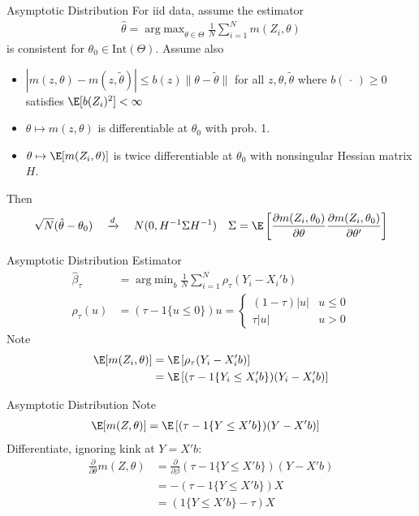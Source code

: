 \documentclass[aspectratio=169, handout]{beamer}
\DeclareMathOperator*{\argmin}{arg\;min}
\DeclareMathOperator*{\argmax}{arg\;max}
\newcommand{\dto}{\xrightarrow{d}}
\newcommand{\sumiN}{\sum^N_{i=1}}
\begin{document}
\begin{frame}{Asymptotic Distribution}
For iid data, assume the estimator
\begin{align*}
  \hat{\theta}
  =
  \argmax_{\theta\in\Theta}
  \frac{1}{N}
  \sumiN
  m(Z_i,\theta)
\end{align*}
is consistent for $\theta_0\in \text{Int}(\Theta)$.
Assume also
\begin{itemize}
  \item
    $|m(z,\theta)-m(z,\tilde{\theta})|\leq b(z)\lVert
    \theta-\tilde{\theta}\rVert$
    for all $z,\theta,\tilde{\theta}$ where
    $b(\,\cdot\,)\geq 0$
    satisfies $\E[b(Z_i)^2]<\infty$
  \item $\theta\mapsto m(z,\theta)$ is differentiable at $\theta_0$ with
    prob. 1.
  \item $\theta\mapsto \E[m(Z_i,\theta)]$ is twice differentiable at
    $\theta_0$ with nonsingular Hessian matrix $H$.
\end{itemize}
Then
\begin{align*}
  \sqrt{N}(\hat{\theta}-\theta_0)
  \quad\dto\quad
  N(0,H^{-1}\Sigma H^{-1})
  \quad
  \Sigma
  =
  \E
  \left[
    \frac{\partial m(Z_i,\theta_0)}{\partial \theta}
    \frac{\partial m(Z_i,\theta_0)}{\partial \theta'}
  \right]
\end{align*}
\end{frame}



\begin{frame}{Asymptotic Distribution}
Estimator
\begin{align*}
  \hat{\beta}_\tau
  &=
  \argmin_b
  \frac{1}{N}
  \sumiN
  \rho_\tau(Y_i-X_i'b)
  \\
  \rho_\tau(u)
  &=
  (\tau-{1}\{u\leq 0\})u
  =
  \begin{cases}
    (1-\tau)|u| & u \leq 0 \\
    \tau|u| & u > 0
  \end{cases}
\end{align*}
Note
\begin{align*}
  \E[m(Z_i,\theta)]
  &=
  \E\left[
    \rho_\tau(Y_i-X_i'b)
  \right]
  \\
  &=
  \E\left[
    (\tau-{1}\{Y_i\leq X_i'b\})(Y_i-X_i'b)
  \right]
\end{align*}
\end{frame}


{\footnotesize
\begin{frame}{Asymptotic Distribution}
Note
\begin{align*}
  \E[m(Z,\theta)]
  &=
  \E\left[
    (\tau-{1}\{Y\leq X'b\})(Y-X'b)
  \right]
\end{align*}
Differentiate, ignoring kink at $Y=X'b$:
\begin{align*}
  \frac{\partial}{\partial \theta}
  m(Z,\theta)
  &=
  \frac{\partial}{\partial \beta}
  (\tau-{1}\{Y\leq X'b\})(Y-X'b)
  \\
  &=
  -
  (\tau-{1}\{Y\leq X'b\})X
  \\
  &=
  ({1}\{Y\leq X'b\}-\tau)X
\end{align*}
\end{frame}
}
\end{document}

